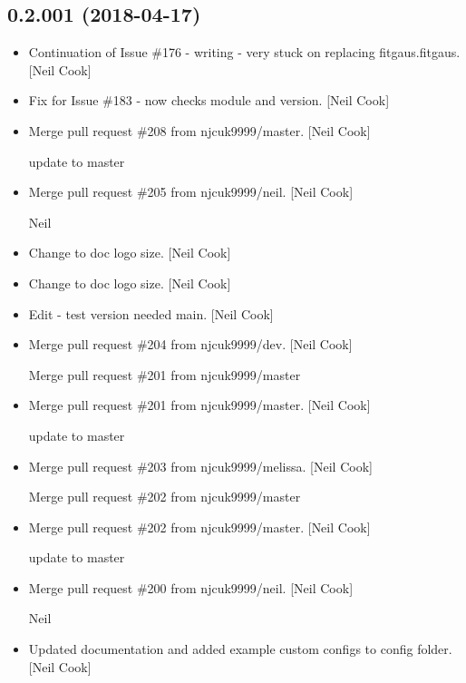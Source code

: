 \documentclass[a4paper,10pt,english]{report}
\begin{document}
\subsection{0.2.001 (2018-04-17)}
\label{\detokenize{misc/changelog:id460}}\begin{itemize}
\item {} 
Continuation of Issue \#176 - writing  - very stuck on replacing
fitgaus.fitgaus. {[}Neil Cook{]}

\item {} 
Fix for Issue \#183 - now checks module and version. {[}Neil Cook{]}

\item {} 
Merge pull request \#208 from njcuk9999/master. {[}Neil Cook{]}

update to master

\item {} 
Merge pull request \#205 from njcuk9999/neil. {[}Neil Cook{]}

Neil

\item {} 
Change to doc logo size. {[}Neil Cook{]}

\item {} 
Change to doc logo size. {[}Neil Cook{]}

\item {} 
Edit - test version needed main. {[}Neil Cook{]}

\item {} 
Merge pull request \#204 from njcuk9999/dev. {[}Neil Cook{]}

Merge pull request \#201 from njcuk9999/master

\item {} 
Merge pull request \#201 from njcuk9999/master. {[}Neil Cook{]}

update to master

\item {} 
Merge pull request \#203 from njcuk9999/melissa. {[}Neil Cook{]}

Merge pull request \#202 from njcuk9999/master

\item {} 
Merge pull request \#202 from njcuk9999/master. {[}Neil Cook{]}

update to master

\item {} 
Merge pull request \#200 from njcuk9999/neil. {[}Neil Cook{]}

Neil

\item {} 
Updated documentation and added example custom configs to config
folder. {[}Neil Cook{]}


\end{itemize}
\end{document}
